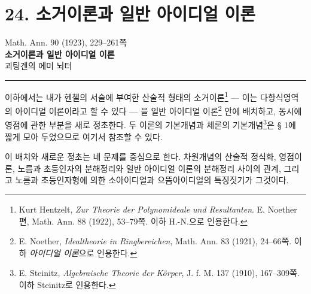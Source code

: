 
\providecommand{\frakS}{\mathfrak S}
\providecommand{\fraka}{\mathfrak a}
\providecommand{\frakb}{\mathfrak b}
\providecommand{\frakc}{\mathfrak c}
\providecommand{\frakg}{\mathfrak g}
\providecommand{\frakG}{\mathfrak G}
\providecommand{\frakh}{\mathfrak h}
\providecommand{\frakm}{\mathfrak m}
\providecommand{\frakM}{\mathfrak M}
\providecommand{\frakn}{\mathfrak n}
\providecommand{\frako}{\mathfrak o}
\providecommand{\frakp}{\mathfrak p}
\providecommand{\frakq}{\mathfrak q}
\providecommand{\frakr}{\mathfrak r}
\providecommand{\frakt}{\mathfrak t}
\providecommand{\frK}{\mathfrak K}
\providecommand{\barfrakm}{\overline{\mathfrak m}}

\section*{24. 소거이론과 일반 아이디얼 이론}
\begin{center}
Math. Ann. 90 (1923), 229--261쪽\\[0.9em]
{\Large\bfseries 소거이론과 일반 아이디얼 이론}\\[1.0em]
괴팅겐의 에미 뇌터\\[0.6em]
\rule{4em}{0.4pt}
\end{center}

이하에서는 내가 헨첼의 서술에 부여한 산술적 형태의 소거이론\footnote{Kurt Hentzelt, \emph{Zur Theorie der Polynomideale und Resultanten}. E. Noether 편, Math. Ann. 88 (1922), 53--79쪽. 이하 H.-N.으로 인용한다.} --- 이는 다항식영역의 아이디얼 이론이라고 할 수 있다 --- 을 일반 아이디얼 이론\footnote{E. Noether, \emph{Idealtheorie in Ringbereichen}, Math. Ann. 83 (1921), 24--66쪽. 이하 \emph{아이디얼 이론}으로 인용한다.} 안에 배치하고, 동시에 영점에 관한 부분을 새로 정초한다. 두 이론의 기본개념과 체론의 기본개념\footnote{E. Steinitz, \emph{Algebraische Theorie der Körper}, J. f. M. 137 (1910), 167--309쪽. 이하 Steinitz로 인용한다.}은 § 1에 짧게 모아 두었으므로 여기서 참조할 수 있다.

이 배치와 새로운 정초는 네 문제를 중심으로 한다. 차원개념의 산술적 정식화, 영점이론, 노름과 초등인자의 분해정리와 일반 아이디얼 이론의 분해정리 사이의 관계, 그리고 노름과 초등인자형에 의한 소아이디얼과 으뜸아이디얼의 특징짓기가 그것이다.

